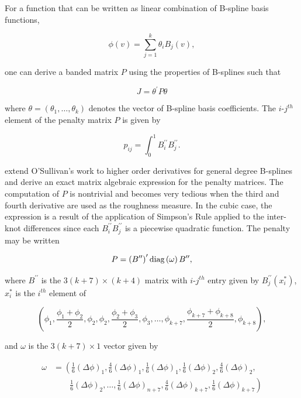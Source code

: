 \noindent
For a function that can be written as linear combination of B-spline basis functions,

\[
\phi\left(v\right) = \sum\limits_{j=1}^k \theta_i B_j\left(v\right),
\]

\noindent
one can derive a banded matrix $P$ using the properties of B-splines such that 

 \[
 J = \theta^\prime P \theta
 \] 
 
 \noindent
 where $\theta = \left(\theta_1,\dots, \theta_k\right)$ denotes the vector of B-spline basis coefficients. The $i$-$j^{th}$ element of the penalty matrix $P$ is given by
 
 \[
 p_{ij} = \int_0^1 B_i^{\prime \prime} B_j^{\prime \prime}.
 \]

\cite{wand2008semiparametric} extend O'Sullivan's work to higher order derivatives for general degree B-splines and derive an exact matrix algebraic expression for the penalty matrices.  The computation of $P$ is nontrivial and becomes very tedious when the third and fourth derivative are used as the roughness measure. In the cubic case, the expression is a result of the application of Simpson's Rule applied to the inter-knot differences since each $B_i^{\prime \prime} B_j^{\prime \prime}$ is a piecewise quadratic function. The penalty may be written

 \[
 P = \left(B^{\prime \prime}\right)^\prime \textup{diag}\left(\omega \right) B^{\prime \prime}, 
 \]
 
 \noindent
 where $B^{\prime \prime}$ is the $3\left( k + 7 \right) \times \left( k + 4 \right)$ matrix with $i$-$j^{th}$ entry given by $B_j^{\prime \prime} \left(x_i^*\right)$, $x^*_i$ is the $i^{th}$ element of 
 
\[
\left( \phi_1,\frac{\phi_1+\phi_2}{2},\phi_2,\phi_2,\frac{\phi_2+\phi_3}{2},\phi_3,\dots,\phi_{k+7},\frac{\phi_{k+7}+\phi_{k+8}}{2},\phi_{k+8} \right),
\]

 \noindent
 and $\omega$ is the $3\left(k+7\right) \times 1$ vector given by
 
\begin{align*}
\omega &= \left( \frac{1}{6}\left(\Delta \phi \right)_1,\frac{4}{6}\left(\Delta \phi \right)_1, \frac{1}{6}\left(\Delta \phi \right)_1,\frac{1}{6}\left(\Delta \phi \right)_2, \frac{4}{6}\left(\Delta \phi \right)_2,  \right. \\
&\qquad   \left. {} \frac{1}{6}\left(\Delta \phi \right)_2 , \dots , \frac{1}{6}\left(\Delta \phi \right)_{n+7}, \frac{4}{6}\left(\Delta \phi \right)_{k+7}, \frac{1}{6}\left(\Delta \phi \right)_{k+7}  \right) \\
\end{align*}

